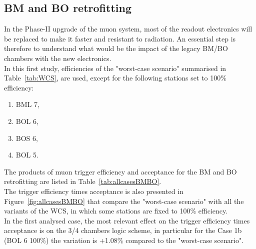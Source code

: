 \subsection{BM and BO retrofitting}
\label{sec:BMBO_retrofit}
In the Phase-II upgrade of the muon system, most of the readout electronics will
be replaced to make it faster and resistant to radiation.
An essential step is therefore to understand what would be the impact of the legacy BM/BO chambers with the new electronics.\\
In this first study, efficiencies of the "worst-case scenario" summarised in Table~\ref{tab:WCS}, are used, except for the following stations set to 100\% efficiency:
\renewcommand{\labelenumii}{\Lowercase{enumii}}
\begin{enumerate}
\item BML 7,
\item BOL 6,
\item BOS 6,
\item BOL 5.
\end{enumerate}
The products of muon trigger efficiency and acceptance for the BM and BO retrofitting are listed in Table~\ref{tab:allcasesBMBO}.\\
The trigger efficiency times acceptance is also presented in Figure~\ref{fig:allcasesBMBO} that compare the "worst-case scenario" with all the variants of the WCS, in which some stations are fixed to 100\% efficiency.\\
In the first analysed case, the most relevant effect on the trigger efficiency times acceptance is on the 3/4 chambers logic scheme, in particular for the Case 1b (BOL 6 100\%) the variation is +1.08\% compared to the "worst-case scenario".
